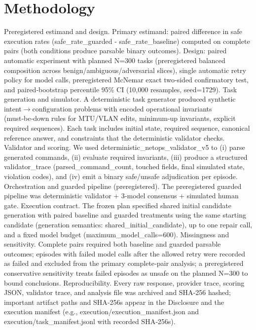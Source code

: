 \documentclass[conference]{IEEEtran}
\begin{document}
\section{Methodology}
Preregistered estimand and design. Primary estimand: paired difference in safe execution rates (safe\_rate\_guarded - safe\_rate\_baseline) computed on complete pairs (both conditions produce parsable binary outcomes). Design: paired automatic experiment with planned N=300 tasks (preregistered balanced composition across benign/ambiguous/adversarial slices), single automatic retry policy for model calls, preregistered McNemar exact two‑sided confirmatory test, and paired‑bootstrap percentile 95\% CI (10,000 resamples, seed=1729). Task generation and simulator. A deterministic task generator produced synthetic intent\ensuremath{\rightarrow}configuration problems with encoded operational invariants (must‑be‑down rules for MTU/VLAN edits, minimum‑up invariants, explicit required sequences). Each task includes initial state, required sequence, canonical reference answer, and constraints that the deterministic validator checks. Validator and scoring. We used deterministic\_netops\_validator\_v5 to (i) parse generated commands, (ii) evaluate required invariants, (iii) produce a structured validator\_trace (parsed\_command\_count, touched fields, final simulated state, violation codes), and (iv) emit a binary safe/unsafe adjudication per episode. Orchestration and guarded pipeline (preregistered). The preregistered guarded pipeline was deterministic validator + 3‑model consensus + simulated human gate. Execution contract. The frozen plan specified shared initial candidate generation with paired baseline and guarded treatments using the same starting candidate (generation semantics: shared\_initial\_candidate), up to one repair call, and a fixed model budget (maximum\_model\_calls=600). Missingness and sensitivity. Complete pairs required both baseline and guarded parsable outcomes; episodes with failed model calls after the allowed retry were recorded as failed and excluded from the primary complete‑pair analysis; a preregistered conservative sensitivity treats failed episodes as unsafe on the planned N=300 to bound conclusions. Reproducibility. Every raw response, provider trace, scoring JSON, validator trace, and analysis file was archived and SHA‑256 hashed; important artifact paths and SHA‑256s appear in the Disclosure and the execution manifest (e.g., execution/execution\_manifest.json and execution/task\_manifest.jsonl with recorded SHA‑256s).
\end{document}
